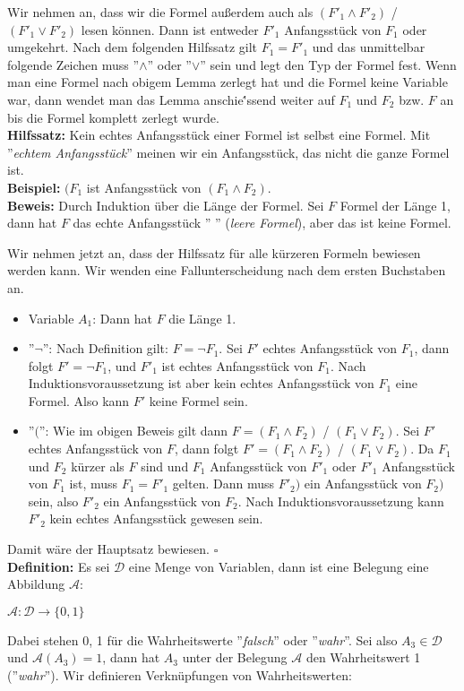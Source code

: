 \documentclass[a4paper]{scrartcl}
\begin{document}
Wir nehmen an, dass wir die Formel außerdem auch als  $(F'_1 \wedge F'_2)$ / $(F'_1 \vee F'_2)$ lesen können. Dann ist entweder $F'_1$ Anfangsstück von $F_1$ oder umgekehrt. Nach dem folgenden Hilfssatz gilt $F_1 = F'_1$ und das unmittelbar folgende Zeichen muss ''$\wedge$'' oder ''$\vee$'' sein und legt den Typ der Formel fest. Wenn man eine Formel nach obigem Lemma zerlegt hat und die Formel keine Variable war, dann wendet man das Lemma anschie{\''ss}end weiter auf $F_1$ und $F_2$ bzw. $F$ an bis die Formel komplett zerlegt wurde.\\
\textbf{Hilfssatz:} Kein echtes Anfangsstück einer Formel ist selbst eine Formel. Mit ''\textit{echtem Anfangsstück}'' meinen wir ein Anfangsstück, das nicht die ganze Formel ist.\\
\textbf{Beispiel:} $(F_1$ ist Anfangsstück von $(F_1 \wedge F_2)$.\\
\textbf{Beweis:} Durch Induktion über die Länge der Formel. Sei $F$ Formel der Länge 1, dann hat $F$ das echte Anfangsstück '' '' (\textit{leere Formel}), aber das ist keine Formel.\\ 

\newpage

Wir nehmen jetzt an, dass der Hilfssatz für alle kürzeren Formeln bewiesen werden kann. Wir wenden eine Fallunterscheidung nach dem ersten Buchstaben an.
\begin{itemize}
\item Variable $A_1$: Dann hat $F$ die Länge 1.
\item ''$\neg$'': Nach Definition gilt: $F = \neg F_1$. Sei $F'$ echtes Anfangsstück von $F_1$, dann folgt $F' = \neg F_1$, und $F'_1$ ist echtes Anfangsstück von $F_1$. Nach Induktionsvoraussetzung ist aber kein echtes Anfangsstück von $F_1$ eine Formel. Also kann $F'$ keine Formel sein.
\item ''$($'': Wie im obigen Beweis gilt dann $F = (F_1 \wedge F_2)$ / $(F_1 \vee F_2)$. Sei $F'$ echtes Anfangsstück von $F$, dann folgt $F' = (F_1 \wedge F_2)$ / $(F_1 \vee F_2)$. Da $F_1$ und $F_2$ kürzer als $F$ sind und $F_1$ Anfangsstück von $F'_1$ oder $F'_1$ Anfangsstück von $F_1$ ist, muss $F_1 = F'_1$ gelten. Dann muss $F'_2)$ ein Anfangsstück von $F_2)$ sein, also $F'_2$ ein Anfangsstück von $F_2$. Nach Induktionsvoraussetzung kann $F'_2$ kein echtes Anfangsstück gewesen sein.
\end{itemize}
Damit wäre der Hauptsatz bewiesen. $\square$\\
\textbf{Definition:} Es sei $\mathcal{D}$ eine Menge von Variablen, dann ist eine Belegung eine Abbildung $\mathcal{A}$:
\begin{center}
$\mathcal{A}: \mathcal{D} \rightarrow \{0, 1\}$
\end{center}
Dabei stehen 0, 1 für die Wahrheitswerte ''\textit{falsch}'' oder ''\textit{wahr}''. Sei also $A_3 \in \mathcal{D}$ und $\mathcal{A}(A_3) = 1$, dann hat $A_3$ unter der Belegung $\mathcal{A}$ den Wahrheitswert 1 (''\textit{wahr}''). Wir definieren Verknüpfungen von Wahrheitswerten:
\end{document}
